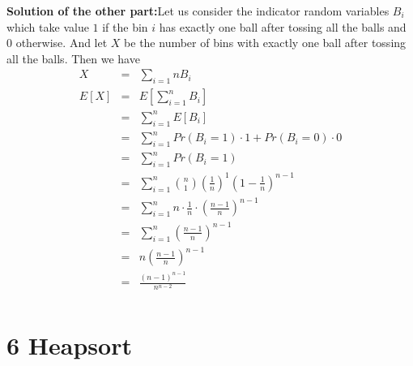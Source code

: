 \documentclass{article}
\begin{document}
\begin{enumerate}
\textbf{Solution of the other part:}Let us consider the indicator random variables $B_i$ which take value $1$ if the bin $i$ has exactly one ball after tossing all the balls and $0$  otherwise. And let $X$ be the number of bins with exactly one ball after tossing all the balls. Then we have
\begin{eqnarray*}
X &=& \sum_{i=1}{n} B_i\\
E\left[X\right] &=& E\left[\sum_{i=1}^{n} B_i \right]\\
&=& \sum_{i=1}^{n}E\left[ B_i \right]\\
&=& \sum_{i=1}^{n}Pr(B_i = 1)\cdot 1 + Pr(B_i = 0)\cdot 0\\
&=& \sum_{i=1}^{n}Pr(B_i = 1)\\
&=& \sum_{i=1}^{n}\binom{n}{1}\left(\frac{1}{n}\right)^1\left(1-\frac{1}{n}\right)^{n-1}\\
&=& \sum_{i=1}^{n}n\cdot \frac{1}{n} \cdot \left(\frac{n-1}{n}\right)^{n-1}\\
&=& \sum_{i=1}^{n}\left(\frac{n-1}{n}\right)^{n-1}\\
&=& n \left(\frac{n-1}{n}\right)^{n-1}\\
&=& \frac{\left(n-1\right)^{n-1}}{n^{n-2}}\\
\end{eqnarray*}
\end{enumerate}

\section*{6 Heapsort}
\end{document}
